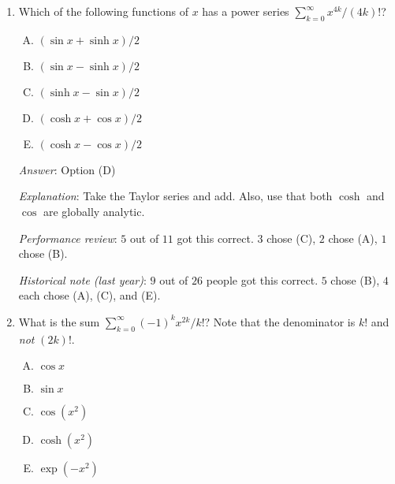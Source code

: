 \documentclass[10pt]{amsart}
\begin{document}
\begin{enumerate}
  {\em Answer}: Option (C)

  {\em Explanation}: The radius of convergence is $1$ for obvious
  reasons. Convergence at the boundary point $-1$ follows from the
  alternating series theorem. At the boundary point $1$, we get a
  $p$-series, which converges if and only if $p > 1$.

  {\em Performance review}: $5$ out of $11$ got this correct. $3$
  chose (A), $2$ chose (D), $1$ chose (B).

  {\em Historical note (last year)}: $4$ out of $26$ people got this
  correct. $10$ chose (B), $7$ chose (A), $3$ chose (E), $2$ chose
  (D).

  {\em Action point}: This should probably be clearer to you after the
  material covered in class on Wednesday and further review that we'll
  do on Friday. In any case, please go through the solution and
  understand it clearly.
\item Which of the following functions of $x$ has a power series
  $\sum_{k=0}^\infty x^{4k}/(4k)!$?
  \begin{enumerate}[(A)]
  \item $(\sin x + \sinh x)/2$
  \item $(\sin x - \sinh x)/2$
  \item $(\sinh x - \sin x)/2$
  \item $(\cosh x + \cos x)/2$
  \item $(\cosh x - \cos x)/2$
  \end{enumerate}

  {\em Answer}: Option (D)

  {\em Explanation}: Take the Taylor series and add. Also, use that
  both $\cosh$ and $\cos$ are globally analytic.

  {\em Performance review}: $5$ out of $11$ got this correct. $3$
  chose (C), $2$ chose (A), $1$ chose (B).

  {\em Historical note (last year)}: $9$ out of $26$ people got this
  correct. $5$ chose (B), $4$ each chose (A), (C), and (E).

\item What is the sum $\sum_{k=0}^\infty (-1)^kx^{2k}/k!$? Note that
  the denominator is $k!$ and {\em not} $(2k)!$.

  \begin{enumerate}[(A)]
  \item $\cos x$
  \item $\sin x$
  \item $\cos(x^2)$
  \item $\cosh(x^2)$
  \item $\exp(-x^2)$
  \end{enumerate}


\end{enumerate}
\end{document}
